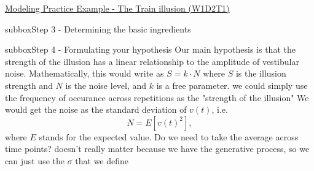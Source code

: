 \begin{textbox}{\href{https://compneuro.neuromatch.io/tutorials/W1D2_ModelingPractice/W1D2_Intro.html}{Modeling Practice Example - The Train illusion (W1D2T1)} }
\begin{subbox}{subbox}{Step 3 - Determining the basic ingredients  }
\end{subbox}
\begin{subbox}{subbox}{Step 4 - Formulating your hypothesis}
\scriptsize
Our main hypothesis is that the strength of the illusion has a linear relationship to the amplitude of vestibular noise.
Mathematically, this would write as
$S = k \cdot N$ where $S$ is the illusion strength and $N$ is the noise level, and $k$ is a free parameter.
we could simply use the frequency of occurance across repetitions as the "strength of the illusion"
We would get the noise as the standard deviation of $v(t)$, i.e.
$$N = E[v(t)^2],$$
where $E$ stands for the expected value.
Do we need to take the average across time points?
doesn't really matter because we have the generative process, so we can just use the $\sigma$ that we define

\end{subbox}

\end{textbox}


